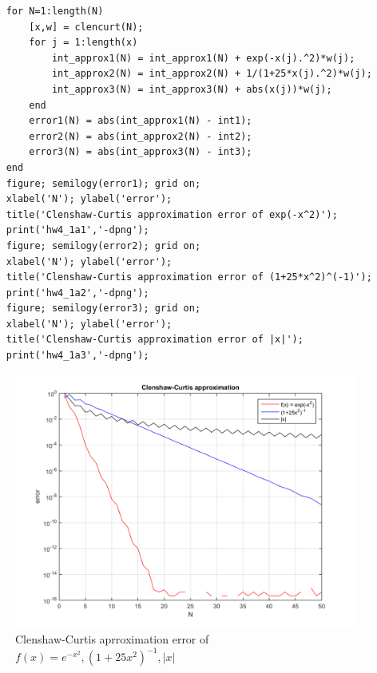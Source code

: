 \documentclass[14pt,a4paper]{article}
\begin{document}
\begin{enumerate}
\begin{lstlisting}
	for N=1:length(N)
		[x,w] = clencurt(N);
		for j = 1:length(x)
			int_approx1(N) = int_approx1(N) + exp(-x(j).^2)*w(j);
			int_approx2(N) = int_approx2(N) + 1/(1+25*x(j).^2)*w(j);
			int_approx3(N) = int_approx3(N) + abs(x(j))*w(j);
		end
		error1(N) = abs(int_approx1(N) - int1);
		error2(N) = abs(int_approx2(N) - int2);
		error3(N) = abs(int_approx3(N) - int3);
	end
	figure; semilogy(error1); grid on;
	xlabel('N'); ylabel('error'); 
	title('Clenshaw-Curtis approximation error of exp(-x^2)');
	print('hw4_1a1','-dpng');
	figure; semilogy(error2); grid on;
	xlabel('N'); ylabel('error'); 
	title('Clenshaw-Curtis approximation error of (1+25*x^2)^(-1)');
	print('hw4_1a2','-dpng');
	figure; semilogy(error3); grid on;
	xlabel('N'); ylabel('error'); 
	title('Clenshaw-Curtis approximation error of |x|');
	print('hw4_1a3','-dpng');
	\end{lstlisting}
	\begin{figure}[htp]
		\centering
		\includegraphics[scale=0.7]{hw4_1a.png}
		\caption{Clenshaw-Curtis aprroximation error of $f(x)=e^{-x^2}, (1+25x^2)^{-1}, |x|$}
	\end{figure}
	\pagebreak
	

\end{enumerate}
\end{document}
